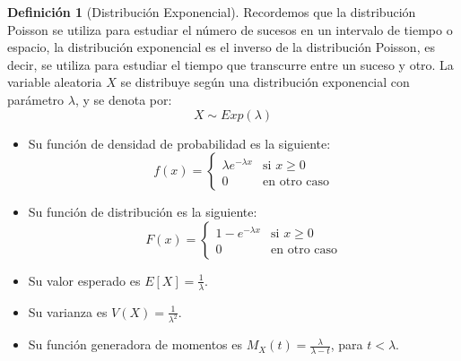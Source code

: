 \documentclass{article}
\theoremstyle{definition}
\newtheorem{definition}{Definición}[section]
\theoremstyle{plain}
\theoremstyle{remark}
\begin{document}
\begin{definition}[Distribución Exponencial]
Recordemos que la distribución Poisson se utiliza para estudiar el número de sucesos en un intervalo de tiempo o espacio, la distribución exponencial es el inverso de la distribución Poisson, es decir, se utiliza para estudiar el tiempo que transcurre entre un suceso y otro. La variable aleatoria $X$ se distribuye según una distribución exponencial con parámetro $\lambda$, y se denota por:
\[
X \sim Exp(\lambda)
\]

\begin{itemize}
\item Su función de densidad de probabilidad es la siguiente:
\[
f(x) = \begin{cases}
\lambda e^{-\lambda x} & \text{si } x \geq 0 \\
0 & \text{en otro caso}
\end{cases}
\]

\item Su función de distribución es la siguiente:
\[
F(x) = \begin{cases}
1 - e^{-\lambda x} & \text{si } x \geq 0 \\
0 & \text{en otro caso}
\end{cases}
\]

\item Su valor esperado es $E[X] = \frac{1}{\lambda}$.
\item Su varianza es $V(X) = \frac{1}{\lambda^2}$.
\item Su función generadora de momentos es $M_X(t) = \frac{\lambda}{\lambda - t}$, para $t < \lambda$.


\end{itemize}

\end{definition}
\end{document}
